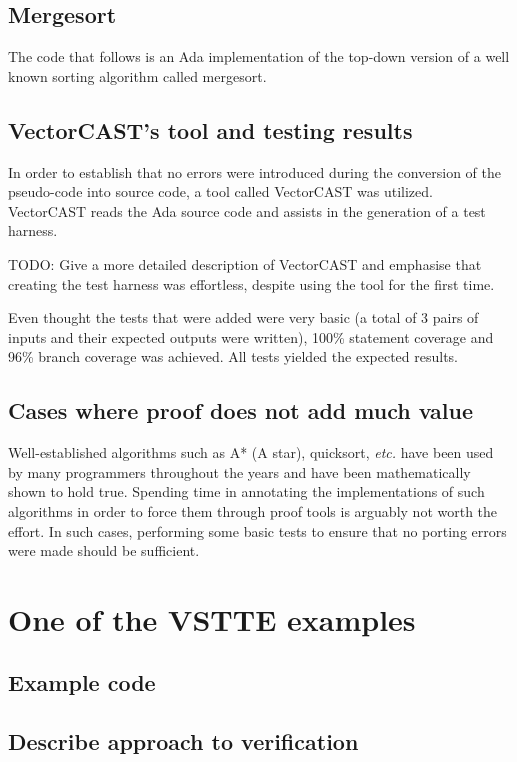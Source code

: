 \documentclass{llncs}
\newcommand{\etc}{\textit{etc.}\xspace}
\begin{document}
\subsection{Mergesort}
The code that follows is an Ada implementation of the top-down version of a well
known sorting algorithm called mergesort.



\subsection{VectorCAST's tool and testing results}
In order to establish that no errors were introduced during the conversion of the
pseudo-code into source code, a tool called VectorCAST was utilized. VectorCAST
reads the Ada source code and assists in the generation of a test harness.

TODO:  Give a more detailed description of VectorCAST and emphasise that creating the
test harness was effortless, despite using the tool for the first time.

Even thought the tests that were added were very basic (a total of 3 pairs
of inputs and their expected outputs were written), 100\% statement coverage and 96\%
branch coverage was achieved. All tests yielded the expected results.

\subsection{Cases where proof does not add much value}
Well-established algorithms such as A* (A star), quicksort, \etc have
been used by many programmers throughout the years and have been mathematically
shown to hold true. Spending time in annotating the implementations of such algorithms
in order to force them through proof tools is arguably not worth the effort. In such cases,
performing some basic tests to ensure that no porting errors were made should be sufficient.



\section{One of the VSTTE examples}
\subsection{Example code}
\subsection{Describe approach to verification}
\end{document}
